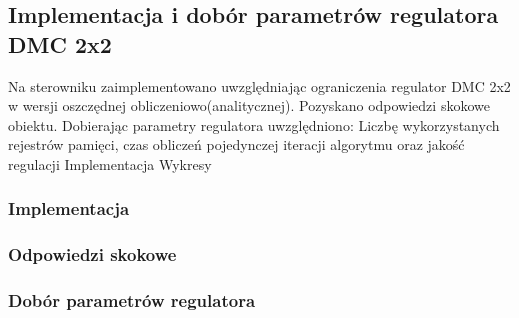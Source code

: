 \subsection{Implementacja i dobór parametrów regulatora DMC 2x2}
\label{lab:zad4}



\ifdefined\CompileFigures
%    
\fi

Na	sterowniku	zaimplementowano	uwzględniając	ograniczenia	regulator	DMC	
2x2	w	wersji	oszczędnej	obliczeniowo(analitycznej). Pozyskano	odpowiedzi	
skokowe	obiektu.	Dobierając	parametry	regulatora	uwzględniono:
Liczbę	wykorzystanych	rejestrów	pamięci,	czas	obliczeń	pojedynczej	iteracji	
algorytmu	oraz	jakość	regulacji
Implementacja	
Wykresy

\subsubsection{Implementacja}


\subsubsection{Odpowiedzi skokowe}


\subsubsection{Dobór parametrów regulatora}




\newpage
